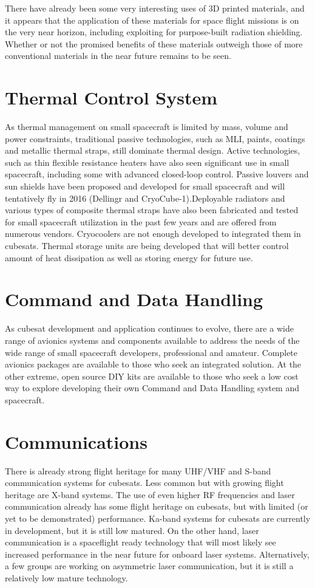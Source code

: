 There have already been some very interesting uses of 3D printed materials, and it appears that the application of these materials for space flight missions is on the very near horizon, including exploiting for purpose-built radiation shielding. Whether or not the promised benefits of these materials outweigh those of more conventional materials in the near future remains to be seen. 

\section{Thermal Control System}
As thermal management on small spacecraft is limited by mass, volume and power constraints, traditional passive technologies, such as MLI, paints, coatings and metallic thermal straps, still dominate thermal design. Active technologies, such as thin flexible resistance heaters have also seen significant use in small spacecraft, including some with advanced closed-loop control. Passive louvers and sun shields have been proposed and developed for small spacecraft and will tentatively fly in 2016 (Dellingr and CryoCube-1).Deployable radiators and various types of composite thermal straps have also been fabricated and tested for small spacecraft utilization in the past few years and are offered from numerous vendors. Cryocoolers are not enough developed to integrated them in cubesats. Thermal storage units are being developed that will better control amount of heat dissipation as well as storing energy for future use. 

\section{Command and Data Handling}
As cubesat development and application continues to evolve, there are a wide range of avionics systems and components available to address the needs of the wide range of small spacecraft developers, professional and amateur. Complete avionics packages are available to those who seek an integrated solution. At the other extreme, open source DIY kits are available to those who seek a low cost way to explore developing their own Command and Data Handling system and spacecraft. 

\section{Communications}
There is already strong flight heritage for many UHF/VHF and S-band communication systems for cubesats. Less common but with growing flight heritage are X-band systems. The use of even higher RF frequencies and laser communication already has some flight heritage on cubesats, but with limited (or yet to be demonstrated) performance. Ka-band systems for cubesats are currently in development, but it is still low matured. On the other hand, laser communication is a spaceflight ready technology that will most likely see increased performance in the near future for onboard laser systems. Alternatively, a few groups are working on asymmetric laser communication, but it is still a relatively low mature technology.

